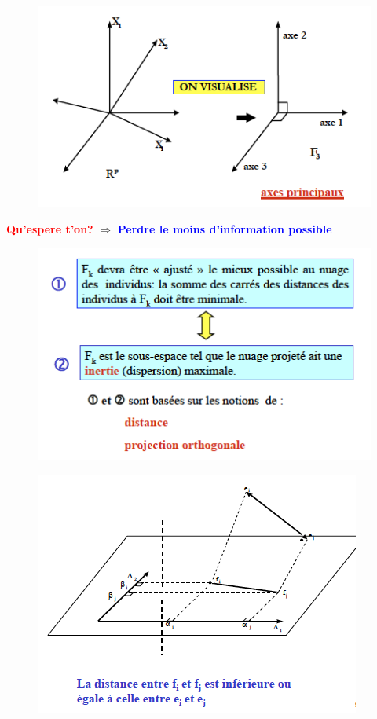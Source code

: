 \documentclass[11pt]{beamer}
\begin{document}
\begin{frame}
\begin{figure}
\includegraphics[scale=0.7]{schema5.png} 
\end{figure}

\textcolor{red}{\textbf{{\Large Qu'espere t'on?}}} $\Rightarrow$ \textcolor{blue}{\textbf{{\Large Perdre le moins d’information possible}}}  

\end{frame}


\begin{frame}

\begin{figure}
\includegraphics[scale=0.7]{schema6.png} 
\end{figure}

\end{frame}

\begin{frame}
\begin{figure}
\includegraphics[scale=0.7]{schema7.png} 
\end{figure}

\end{frame}
\end{document}
